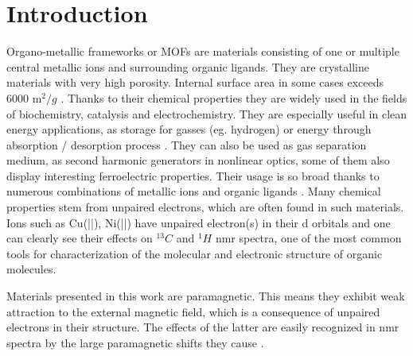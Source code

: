 \documentclass[openany, longbibliography,slovene,a4paper,12pt]{article}
\begin{document}
\section{Introduction}

Organo-metallic frameworks or MOFs are materials consisting of one or multiple
central metallic ions and surrounding organic ligands.  They are crystalline
materials with very high porosity. Internal surface area in some cases exceeds
6000 $\mathrm{m}^2/{g}$ \cite{introd_to_metal_organ_frameworks}. Thanks to their
chemical properties they are widely used in the fields of biochemistry,
catalysis and electrochemistry. They are especially useful in clean energy
applications, as storage for gasses (eg. hydrogen) or energy through
absorption / desorption process \cite{introd_to_metal_organ_frameworks}. They can
also be used as gas separation medium, as second harmonic generators in
nonlinear optics, some of them also display interesting ferroelectric
properties. Their usage is so broad thanks to numerous combinations of metallic
ions and organic ligands  \cite{introd_to_metal_organ_frameworks, Assignment_of_Solid_State}. Many chemical properties stem from unpaired
electrons, which are often found in such materials. Ions such as Cu(||), Ni(||) have unpaired electron(s) in their d orbitals and one can clearly see their
 effects on $^{13}C$ and $^{1}H$ nmr  spectra, one of the most common tools for
 characterization of the molecular and electronic structure of organic
 molecules.

 Materials presented in this work are paramagnetic. This means they exhibit weak
 attraction to the external magnetic field, which is a consequence of unpaired
 electrons in their structure. The effects of the latter are easily recognized
 in nmr spectra by the large paramagnetic shifts they cause \cite{Dft_Investigation_of_the_Effect_of_Spin_Orbit}.
\end{document}
